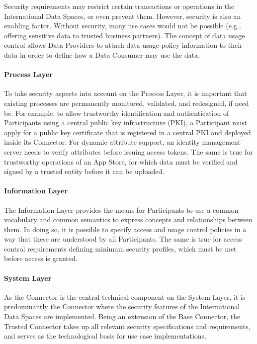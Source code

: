 Security requirements may restrict certain transactions or operations in the International Data Spaces, or even prevent them. However, security is also an enabling factor. Without security, many use cases would not be possible (e.g., offering sensitive data to trusted business partners). The concept of data usage control allows Data Providers to attach data usage policy information to their data in order to define how a Data Consumer may use the data.

\paragraph*{Process Layer\\}

To take security aspects into account on the Process Layer, it is important that existing processes are permanently monitored, validated, and redesigned, if need be. For example, to allow trustworthy identification and authentication of Participants using a central public key infrastructure (PKI), a Participant must apply for a public key certificate that is registered in a central PKI and deployed inside its Connector. For dynamic attribute support, an identity management server needs to verify attributes before issuing access tokens. The same is true for trustworthy operations of an App Store, for which data must be verified and signed by a trusted entity before it can be uploaded.

\paragraph*{Information Layer\\}

The Information Layer provides the means for Participants to use a common vocabulary and common semantics to express concepts and relationships between them. In doing so, it is possible to specify access and usage control policies in a way that these are understood by all Participants. The same is true for access control requirements defining minimum security profiles, which must be met before access is granted.

\paragraph*{System Layer\\}

As the Connector is the central technical component on the System Layer, it is predominantly the Connector where the security features of the International Data Spaces are implemented. Being an extension of the Base Connector, the Trusted Connector takes up all relevant security specifications and requirements, and serves as the technological basis for use case implementations.

